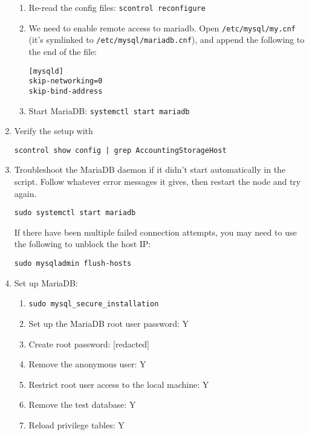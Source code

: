 \begin{enumerate}
\begin{enumerate}
    \item Re-read the config files: \texttt{scontrol reconfigure}

    \item We need to enable remote access to mariadb. Open \texttt{/etc/mysql/my.cnf} (it's symlinked to \texttt{/etc/mysql/mariadb.cnf}), and append the following to the end of the file:

      \texttt{[mysqld]} \\
      \texttt{skip-networking=0} \\
      \texttt{skip-bind-address}

    \item Start MariaDB: \texttt{systemctl start mariadb}
    \end{enumerate}


  \item Verify the setup with

    \texttt{scontrol show config | grep AccountingStorageHost}

  \item Troubleshoot the MariaDB daemon if it didn't start automatically in the script. Follow whatever error messages it gives, then restart the node and try again.

    \texttt{sudo systemctl start mariadb}

    If there have been multiple failed connection attempts, you may need to use the following to unblock the host IP: 

    \texttt{sudo mysqladmin flush-hosts}

  \item Set up MariaDB:

    \begin{enumerate}
      \item \texttt{sudo mysql\_secure\_installation}
      \item Set up the MariaDB root user password: Y 
      \item Create root password: [redacted]
      \item Remove the anonymous user: Y
      \item Restrict root user access to the local machine: Y
      \item Remove the test database: Y
      \item Reload privilege tables: Y
    \end{enumerate}


\end{enumerate}
